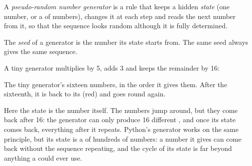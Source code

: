 \begin{definition}\label{def:g9:randomness-and-simulation:prng}
A \emph{pseudo-random number generator}
is a rule that keeps a hidden \emph{state} (one number, or a  of numbers),
changes it at each step and reads the next number from it, so that the
sequence looks random although it is fully determined.
\end{definition}

\begin{definition}[Seed]\label{def:g9:randomness-and-simulation:seed}
The \emph{seed} of a generator is the number its state starts from. The
same seed always gives the same sequence.
\end{definition}

A tiny generator multiplies by 5, adds 3 and keeps the remainder by 16:

\label{lst:g9:randomness-and-simulation:tiny}

\label{out:g9:randomness-and-simulation:tiny}

\begin{omfigure}

{\small The tiny generator's sixteen numbers, in the order it gives them. After
the sixteenth, it is back to its  (red) and goes round again.}
\end{omfigure}

Here the state is the number itself. The numbers jump around, but they come
back after 16: the generator can only produce 16 different , and once
its state comes back, everything after it repeats. Python's generator works on
the same principle, but its state is a  of hundreds of numbers: a
number it gives can come back without the sequence repeating, and the cycle of
its state is far beyond anything a  could ever use.

